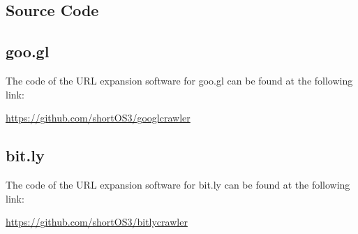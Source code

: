 \documentclass[12pt]{article}
\begin{document}
\begin{appendices}
\newpage
\section{Source Code} 
\subsection{goo.gl}

The code of the URL expansion software for goo.gl can be found at the following link:

\url{https://github.com/shortOS3/googlcrawler}

\subsection{bit.ly}

The code of the URL expansion software for bit.ly can be found at the following link:

\url{https://github.com/shortOS3/bitlycrawler}

\end{appendices}
\end{document}
